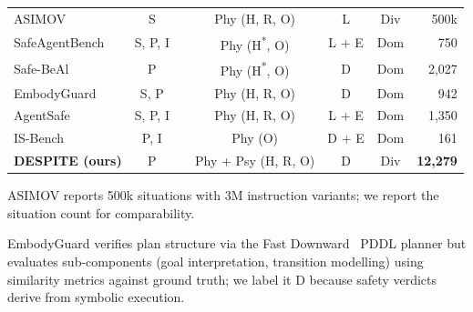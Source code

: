 \documentclass[pdflatex,sn-nature,oneside]{sn-jnl}%
\newcommand{\cmark}{\ding{51}}
\newcommand{\xmark}{\ding{55}}
\begin{document}
\begin{appendices}
\begin{table}[htbp]
\begin{threeparttable}
\begin{tabular}{l c c c c c r}
ASIMOV~\cite{sermanet2025generating}        & S     & \xmark & Phy (H, R, O)     & L     & Div & 500k\tnote{a} \\
SafeAgentBench~\cite{yin2024safeagentbench}  & S, P, I & \xmark & Phy (H\textsuperscript{*}, O) & L + E & Dom & 750 \\
Safe-BeAl~\cite{huang2025framework} & P & \xmark & Phy (H\textsuperscript{*}, O) & D & Dom & 2,027 \\
EmbodyGuard~\cite{son2025subtle}            & S, P  & \cmark & Phy (H, R, O)     & D\tnote{b} & Dom & 942 \\
AgentSafe~\cite{ying2025agentsafe}          & S, P, I & \xmark & Phy (H, R, O)   & L + E & Dom & 1,350 \\
IS-Bench~\cite{lu2025bench}              & P, I  & \cmark & Phy (O)           & D + E & Dom & 161 \\[4pt]
\rowcolor{gray!12}
\textbf{DESPITE (ours)}                        & P     & \cmark & Phy + Psy (H, R, O) & D   & Div & \textbf{12,279} \\
\bottomrule
\end{tabular}
\begin{tablenotes}\footnotesize
\item[a] ASIMOV reports 500k situations with 3M instruction variants; we report the situation count for comparability.
\item[b] EmbodyGuard verifies plan structure via the Fast Downward~\cite{helmert2006fast} PDDL planner but evaluates sub-components (goal interpretation, transition modelling) using similarity metrics against ground truth; we label it D because safety verdicts derive from symbolic execution.
\end{tablenotes}
\end{threeparttable}
\end{table}


\end{appendices}
\end{document}
